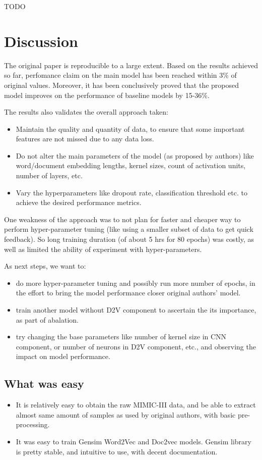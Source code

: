\documentclass[11pt,a4paper]{article}
\begin{document}
TODO

\section{Discussion}

The original paper is reproducible to a large extent. Based on the results achieved so far, perfomance claim on the main model has been reached within 3\% of original values. Moreover, it has been conclusively proved that the proposed model improves on the performance of baseline models by 15-36\%.

The results also validates the overall approach taken:
\begin{itemize}
	\item Maintain the quality and quantity of data, to ensure that some important features are not missed due to any data loss.
	\item Do not alter the main parameters of the model (as proposed by authors) like word/document embedding lengths, kernel sizes, count of activation units, number of layers, etc.
	\item Vary the hyperparameters like dropout rate, classification threshold etc. to achieve the desired performance metrics. 
\end{itemize}

One weakness of the approach was to not plan for faster and cheaper way to perform hyper-parameter tuning (like using a smaller subset of data to get quick feedback). So long training duration (of about 5 hrs for 80 epochs) was costly, as well as limited the ability of experiment with hyper-parameters.

As next steps, we want to:
\begin{itemize}
	\item do more hyper-parameter tuning and possibly run more number of epochs, in the effort to bring the model performance closer original authors' model.
	\item train another model without D2V component to ascertain the its importance, as part of abalation.
	\item try changing the base parameters like number of kernel size in CNN component, or number of neurons in D2V component, etc., and observing the impact on model performance.
\end{itemize}




\subsection{What was easy}
\begin{itemize}
	\item It is relatively easy to obtain the raw MIMIC-III data, and be able to extract almost same amount of samples as used by original authors, with basic pre-processing. 
	\item It was easy to train Gensim Word2Vec and Doc2vec models. Gensim library is pretty stable, and intuitive to use, with decent documentation.
\end{itemize}
\end{document}
